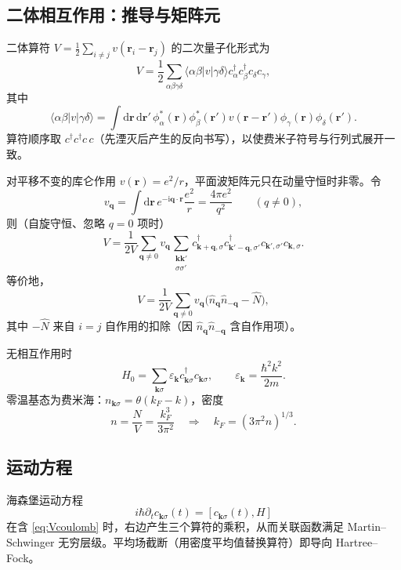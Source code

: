\subsection{二体相互作用：推导与矩阵元}

二体算符 $V=\frac12\sum_{i\neq j}v(\mathbf{r}_i-\mathbf{r}_j)$ 的二次量子化形式为
\begin{equation}
  V=\frac12\sum_{\alpha\beta\gamma\delta}
  \langle\alpha\beta|v|\gamma\delta\rangle
  c_\alpha^\dagger c_\beta^\dagger c_\delta c_\gamma,
\label{eq:V2nd}
\end{equation}
其中
\begin{equation}
  \langle\alpha\beta|v|\gamma\delta\rangle
  =\int\mathrm{d}\mathbf{r}\,\mathrm{d}\mathbf{r}'\,
  \phi_\alpha^*(\mathbf{r})\phi_\beta^*(\mathbf{r}')
  v(\mathbf{r}-\mathbf{r}')
  \phi_\gamma(\mathbf{r})\phi_\delta(\mathbf{r}').
\end{equation}
算符顺序取 $c^\dagger c^\dagger c\,c$（先湮灭后产生的反向书写），以使费米子符号与行列式展开一致。

对平移不变的库仑作用 $v(\mathbf{r})=e^2/r$，平面波矩阵元只在动量守恒时非零。令
\begin{equation}
  v_{\mathbf{q}}=\int\mathrm{d}\mathbf{r}\,e^{-\mathrm{i}\mathbf{q}\cdot\mathbf{r}}\frac{e^2}{r}
  =\frac{4\pi e^2}{q^2}
  \qquad(q\neq0),\label{eq:vq}
\end{equation}
则（自旋守恒、忽略 $q=0$ 项时）
\begin{equation}
  V=\frac{1}{2V}\sum_{\mathbf{q}\neq0}v_{\mathbf{q}}
  \sum_{\substack{\mathbf{k}\mathbf{k}'\\ \sigma\sigma'}}
  c_{\mathbf{k}+\mathbf{q},\sigma}^\dagger
  c_{\mathbf{k}'-\mathbf{q},\sigma'}^\dagger
  c_{\mathbf{k}',\sigma'}
  c_{\mathbf{k},\sigma}.
\label{eq:Vcoulomb}
\end{equation}
等价地，
\begin{equation}
  V=\frac{1}{2V}\sum_{\mathbf{q}\neq0}v_{\mathbf{q}}
  \bigl(\hat n_{\mathbf{q}}\hat n_{-\mathbf{q}}-\hat N\bigr),
\end{equation}
其中 $-\hat N$ 来自 $i=j$ 自作用的扣除（因 $\hat n_{\mathbf{q}}\hat n_{-\mathbf{q}}$ 含自作用项）。

\begin{example}[自由费米气]
无相互作用时
\begin{equation}
  H_0=\sum_{\mathbf{k}\sigma}\varepsilon_{\mathbf{k}}
  c_{\mathbf{k}\sigma}^\dagger c_{\mathbf{k}\sigma},
  \qquad
  \varepsilon_{\mathbf{k}}=\frac{\hbar^2k^2}{2m}.
\end{equation}
零温基态为费米海：$n_{\mathbf{k}\sigma}=\theta(k_F-k)$，密度
\begin{equation}
  n=\frac{N}{V}=\frac{k_F^3}{3\pi^2}
  \quad\Rightarrow\quad
  k_F=(3\pi^2 n)^{1/3}.
\end{equation}
\end{example}

\subsection{运动方程}

海森堡运动方程
\begin{equation}
  i\hbar\partial_t c_{\mathbf{k}\sigma}(t)
  =[c_{\mathbf{k}\sigma}(t),H]
\end{equation}
在含 \eqref{eq:Vcoulomb} 时，右边产生三个算符的乘积，从而关联函数满足 Martin--Schwinger 无穷层级。平均场截断（用密度平均值替换算符）即导向 Hartree--Fock。
